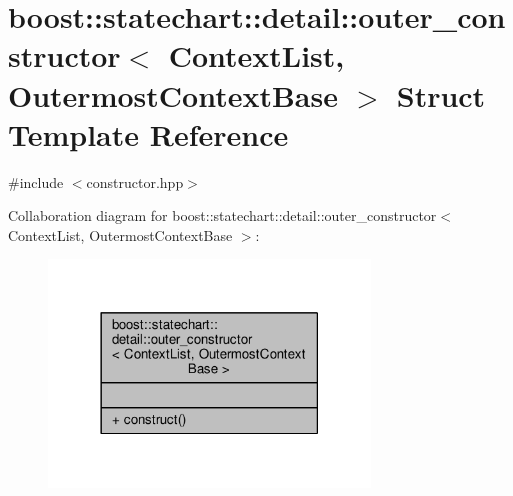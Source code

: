 \hypertarget{structboost_1_1statechart_1_1detail_1_1outer__constructor}{}\section{boost\+:\+:statechart\+:\+:detail\+:\+:outer\+\_\+constructor$<$ Context\+List, Outermost\+Context\+Base $>$ Struct Template Reference}
\label{structboost_1_1statechart_1_1detail_1_1outer__constructor}


{\ttfamily \#include $<$constructor.\+hpp$>$}



Collaboration diagram for boost\+:\+:statechart\+:\+:detail\+:\+:outer\+\_\+constructor$<$ Context\+List, Outermost\+Context\+Base $>$\+:
\nopagebreak
\begin{figure}[H]
\begin{center}
\leavevmode
\includegraphics[width=242pt]{structboost_1_1statechart_1_1detail_1_1outer__constructor__coll__graph}
\end{center}
\end{figure}
